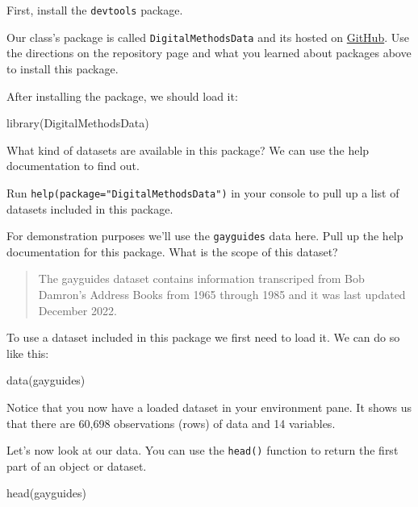 \documentclass[
]{article}
\newenvironment{Shaded}{\begin{snugshade}}{\end{snugshade}}
\newcommand{\FunctionTok}[1]{\textcolor[rgb]{0.00,0.00,0.00}{#1}}
\newcommand{\NormalTok}[1]{#1}
\begin{document}
First, install the \texttt{devtools} package.

Our class's package is called \texttt{DigitalMethodsData} and its hosted
on \href{https://github.com/regan008/DigitalMethodsData}{GitHub}. Use
the directions on the repository page and what you learned about
packages above to install this package.

After installing the package, we should load it:

\begin{Shaded}
\begin{Highlighting}[]
\FunctionTok{library}\NormalTok{(DigitalMethodsData)}
\end{Highlighting}
\end{Shaded}

What kind of datasets are available in this package? We can use the help
documentation to find out.

Run \texttt{help(package="DigitalMethodsData")} in your console to pull
up a list of datasets included in this package.

For demonstration purposes we'll use the \texttt{gayguides} data here.
Pull up the help documentation for this package. What is the scope of
this dataset?

\begin{quote}
The gayguides dataset contains information transcriped from Bob Damron's
Address Books from 1965 through 1985 and it was last updated December
2022.
\end{quote}

To use a dataset included in this package we first need to load it. We
can do so like this:

\begin{Shaded}
\begin{Highlighting}[]
\FunctionTok{data}\NormalTok{(gayguides)}
\end{Highlighting}
\end{Shaded}

Notice that you now have a loaded dataset in your environment pane. It
shows us that there are 60,698 observations (rows) of data and 14
variables.

Let's now look at our data. You can use the \texttt{head()} function to
return the first part of an object or dataset.

\begin{Shaded}
\begin{Highlighting}[]
\FunctionTok{head}\NormalTok{(gayguides)}
\end{Highlighting}
\end{Shaded}
\end{document}
